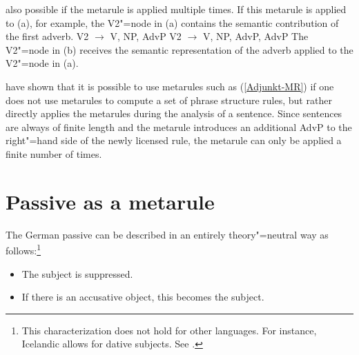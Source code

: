 also possible if the metarule is applied multiple times. If this metarule is applied to (a),
for example, the V2"=node in (a) contains the semantic contribution of the first adverb.
\eal
\ex V2 $\to$ V, NP, AdvP
\ex V2 $\to$ V, NP, AdvP, AdvP
\zl
The V2"=node in (b) receives the semantic representation of the adverb applied to the V2"=node in
(a).

\citet{WP92b} have shown that it is possible to use metarules such as (\ref{Adjunkt-MR}) if one does not use
metarules to compute a set of phrase structure rules, but rather directly applies the metarules
during the analysis of a sentence. Since sentences are always of finite length and the metarule
introduces an additional AdvP to the right"=hand side of the newly licensed rule, the metarule can
only be applied a finite number of times.  

\section{Passive as a metarule}
\label{sec-passive-gpsg}

The German passive can be described in an entirely theory"=neutral way as
follows:\footnote{
  This characterization does not hold for other languages. For instance, Icelandic allows for dative
  subjects. See \citet*{ZMT85a}.
}
\begin{itemize}
\item The subject is suppressed. 
\item If there is an accusative object, this becomes the subject.
\end{itemize}

